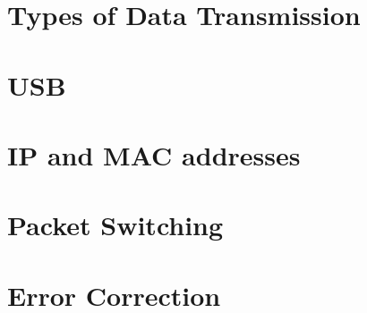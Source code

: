 \documentclass[../main.tex]{subfiles}
\begin{document}
\section{Types of Data Transmission}


\section{USB}
\label{2:usb}


\section{IP and MAC addresses}


\section{Packet Switching}


\section{Error Correction}

\end{document}
